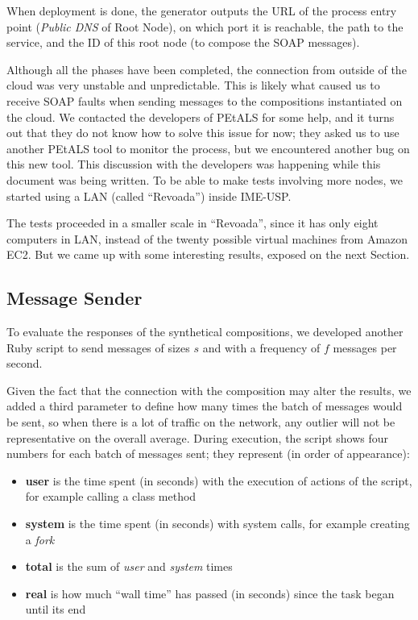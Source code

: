 When deployment is done, the generator outputs the URL of the process entry point (\emph{Public DNS} of Root Node), on which port it is reachable, the path to the service, and the ID of this root node (to compose the SOAP messages).

Although all the phases have been completed, the connection from outside of the cloud was very unstable and unpredictable. This is likely what caused us to receive SOAP faults when sending messages to the compositions instantiated on the cloud. We contacted the developers of PEtALS for some help, and it turns out that they do not know how to solve this issue for now; they asked us to use another PEtALS tool to monitor the process, but we encountered another bug on this new tool. This discussion with the developers was happening while this document was being written. To be able to make tests involving more nodes, we started using a LAN (called ``Revoada'') inside IME-USP.

The tests proceeded in a smaller scale in ``Revoada'', since it has only eight computers in LAN, instead of the twenty possible virtual machines from Amazon EC2. But we came up with some interesting results, exposed on the next Section.


\subsection{Message Sender}

To evaluate the responses of the synthetical compositions, we developed another Ruby script to send messages of sizes $s$ and with a frequency of $f$ messages per second.

Given the fact that the connection with the composition may alter the results, we added a third parameter to define how many times the batch of messages would be sent, so when there is a lot of traffic on the network, any outlier will not be representative on the overall average. During execution, the script shows four numbers for each batch of messages sent; they represent (in order of appearance):

\begin{itemize} 
	\item \textbf{user} is the time spent (in seconds) with the execution of actions of the script, for example calling a class method
	\item \textbf{system} is the time spent (in seconds) with system calls, for example creating a \emph{fork}
	\item \textbf{total} is the sum of \emph{user} and \emph{system} times
	\item \textbf{real} is how much ``wall time'' has passed (in seconds) since the task began until its end
\end{itemize}

